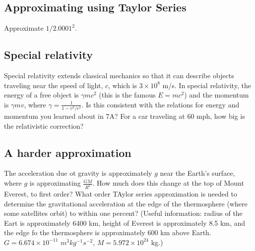 \documentclass{article}
\begin{document}
\subsection{Approximating using Taylor Series}

Approximate $1/2.0001^2$.

\subsection{Special relativity}

Special relativity extends classical mechanics so that it can describe objects traveling near the speed of light, $c$, which is $3\times10^8$ m/s. In special relativity, the energy of a free object is $\gamma mc^2$ (this is the famous $E=mc^2$) and the momentum is $\gamma mv$, where $\gamma = \frac{1}{1-v^2/c^2}$. Is this consistent with the relations for energy and momentum you learned about in 7A? For a car traveling at 60 mph, how big is the relativistic correction?

\subsection{A harder approximation}

The acceleration due ot gravity is approximately $g$ near the Earth's surface, where $g$ is approximating $\frac{GM}{R^2}$. How much does this change at the top of Mount Everest, to first order? What order TAylor series approximation is needed to determine the gravitational acceleration at the edge of the thermosphere (where some satellites orbit) to within one percent? (Useful information: radius of the Eart is approximately 6400 km, height of Everest is approximately 8.5 km, and the edge fo the thermosphere is approximately 600 km above Earth. $G=6.674\times10^{-11}$ $m^3 kg^{-1} s^{-2}$, $M=5.972\times10^{24}$ kg.)
\end{document}
